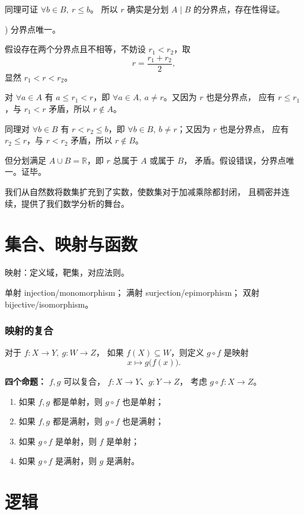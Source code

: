 \documentclass[UTF8,11pt]{ctexart}
\theoremstyle{cnthm}
\begin{document}
同理可证 $\forall b\in B,\ r\leq b$。
所以 $r$ 确实是分划 $A\mid B$ 的分界点，存在性得证。

) 分界点唯一。

假设存在两个分界点且不相等，不妨设 $r_1<r_2$，取
\[
r=\frac{r_1+r_2}{2},
\]
显然 $r_1<r<r_2$。

对 $\forall a\in A$ 有 $a\leq r_1<r$，即
$\forall a\in A,\ a\neq r$。又因为 $r$ 也是分界点，
应有 $r\leq r_1$，与 $r_1<r$ 矛盾，所以 $r\notin A$。

同理对 $\forall b\in B$ 有 $r<r_2\leq b$，即
$\forall b\in B,\ b\neq r$；又因为 $r$ 也是分界点，
应有 $r_2\leq r$，与 $r<r_2$ 矛盾，所以 $r\notin B$。

但分划满足 $A\cup B=\mathbb R$，即 $r$ 总属于 $A$ 或属于 $B$，
矛盾。假设错误，分界点唯一。证毕。

\medskip

我们从自然数将数集扩充到了实数，使数集对于加减乘除都封闭，
且稠密并连续，提供了我们数学分析的舞台。

\section{集合、映射与函数}

映射：定义域，靶集，对应法则。

单射 injection/monomorphism；
满射 surjection/epimorphism；
双射 bijective/isomorphism。

\subsubsection*{映射的复合}

对于 $f:X\longrightarrow Y,\ g:W\longrightarrow Z$，
如果 $f(X)\subseteq W$，则定义 $g\circ f$ 是映射
\[
x\longmapsto g\bigl(f(x)\bigr).
\]

\textbf{四个命题：} $f,g$ 可以复合，
$f:X\longrightarrow Y$、$g:Y\longrightarrow Z$，
考虑 $g\circ f:X\longrightarrow Z$。

\begin{enumerate}
\item 如果 $f,g$ 都是单射，则 $g\circ f$ 也是单射；
\item 如果 $f,g$ 都是满射，则 $g\circ f$ 也是满射；
\item 如果 $g\circ f$ 是单射，则 $f$ 是单射；
\item 如果 $g\circ f$ 是满射，则 $g$ 是满射。
\end{enumerate}

\section{逻辑}
\end{document}
